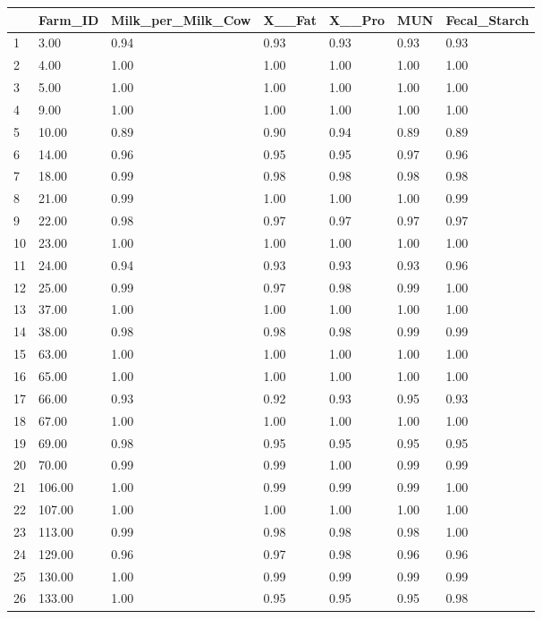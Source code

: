 \documentclass[12pt,]{article}
\begin{document}
\begin{longtable}{l|l|l|l|l|l|l}
  \hline
 & Farm\_ID & Milk\_per\_Milk\_Cow & X\_\_Fat & X\_\_Pro & MUN & Fecal\_Starch \\ 
  \hline
1 & 3.00 & 0.94 & 0.93 & 0.93 & 0.93 & 0.93 \\ 
  2 & 4.00 & 1.00 & 1.00 & 1.00 & 1.00 & 1.00 \\ 
  3 & 5.00 & 1.00 & 1.00 & 1.00 & 1.00 & 1.00 \\ 
  4 & 9.00 & 1.00 & 1.00 & 1.00 & 1.00 & 1.00 \\ 
  5 & 10.00 & 0.89 & 0.90 & 0.94 & 0.89 & 0.89 \\ 
  6 & 14.00 & 0.96 & 0.95 & 0.95 & 0.97 & 0.96 \\ 
  7 & 18.00 & 0.99 & 0.98 & 0.98 & 0.98 & 0.98 \\ 
  8 & 21.00 & 0.99 & 1.00 & 1.00 & 1.00 & 0.99 \\ 
  9 & 22.00 & 0.98 & 0.97 & 0.97 & 0.97 & 0.97 \\ 
  10 & 23.00 & 1.00 & 1.00 & 1.00 & 1.00 & 1.00 \\ 
  11 & 24.00 & 0.94 & 0.93 & 0.93 & 0.93 & 0.96 \\ 
  12 & 25.00 & 0.99 & 0.97 & 0.98 & 0.99 & 1.00 \\ 
  13 & 37.00 & 1.00 & 1.00 & 1.00 & 1.00 & 1.00 \\ 
  14 & 38.00 & 0.98 & 0.98 & 0.98 & 0.99 & 0.99 \\ 
  15 & 63.00 & 1.00 & 1.00 & 1.00 & 1.00 & 1.00 \\ 
  16 & 65.00 & 1.00 & 1.00 & 1.00 & 1.00 & 1.00 \\ 
  17 & 66.00 & 0.93 & 0.92 & 0.93 & 0.95 & 0.93 \\ 
  18 & 67.00 & 1.00 & 1.00 & 1.00 & 1.00 & 1.00 \\ 
  19 & 69.00 & 0.98 & 0.95 & 0.95 & 0.95 & 0.95 \\ 
  20 & 70.00 & 0.99 & 0.99 & 1.00 & 0.99 & 0.99 \\ 
  21 & 106.00 & 1.00 & 0.99 & 0.99 & 0.99 & 1.00 \\ 
  22 & 107.00 & 1.00 & 1.00 & 1.00 & 1.00 & 1.00 \\ 
  23 & 113.00 & 0.99 & 0.98 & 0.98 & 0.98 & 1.00 \\ 
  24 & 129.00 & 0.96 & 0.97 & 0.98 & 0.96 & 0.96 \\ 
  25 & 130.00 & 1.00 & 0.99 & 0.99 & 0.99 & 0.99 \\ 
  26 & 133.00 & 1.00 & 0.95 & 0.95 & 0.95 & 0.98 \\ 

\end{longtable}
\end{document}
